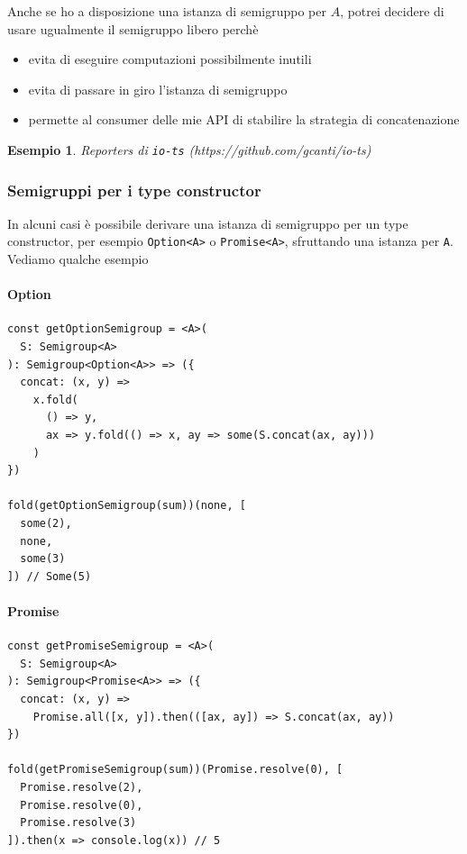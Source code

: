 \documentclass[12pt]{article}
\newtheorem{example}{Esempio}
\begin{document}
Anche se ho a disposizione una istanza di semigruppo per $A$, potrei decidere di usare ugualmente il semigruppo libero perchè

\begin{itemize}
  \item evita di eseguire computazioni possibilmente inutili
  \item evita di passare in giro l'istanza di semigruppo
  \item permette al consumer delle mie API di stabilire la strategia di concatenazione
\end{itemize}

\begin{example}
Reporters di \texttt{io-ts} (https://github.com/gcanti/io-ts)
\end{example}

\subsubsection{Semigruppi per i type constructor}

In alcuni casi è possibile derivare una istanza di semigruppo per un type constructor, per esempio \texttt{Option<A>} o \texttt{Promise<A>},
sfruttando una istanza per \texttt{A}. Vediamo qualche esempio

\paragraph{Option}

\begin{verbatim}
const getOptionSemigroup = <A>(
  S: Semigroup<A>
): Semigroup<Option<A>> => ({
  concat: (x, y) =>
    x.fold(
      () => y,
      ax => y.fold(() => x, ay => some(S.concat(ax, ay)))
    )
})

fold(getOptionSemigroup(sum))(none, [
  some(2),
  none,
  some(3)
]) // Some(5)
\end{verbatim}

\paragraph{Promise}

\begin{verbatim}
const getPromiseSemigroup = <A>(
  S: Semigroup<A>
): Semigroup<Promise<A>> => ({
  concat: (x, y) =>
    Promise.all([x, y]).then(([ax, ay]) => S.concat(ax, ay))
})

fold(getPromiseSemigroup(sum))(Promise.resolve(0), [
  Promise.resolve(2),
  Promise.resolve(0),
  Promise.resolve(3)
]).then(x => console.log(x)) // 5
\end{verbatim}
\end{document}
